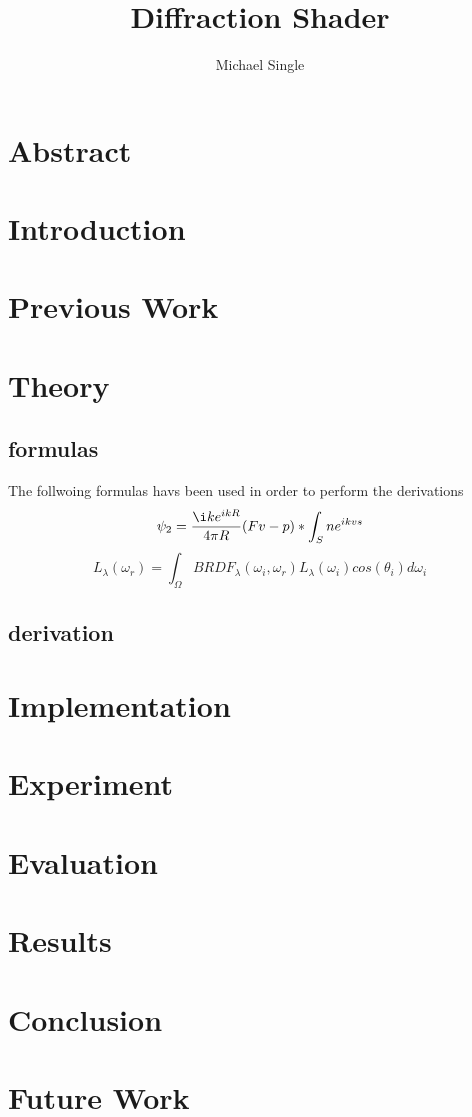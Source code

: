 \documentclass[12pt]{article}
\begin{document}
\title{Diffraction Shader}
\author{Michael Single}
\maketitle

\section{Abstract}
\section{Introduction}
\section{Previous Work}
\section{Theory}
	\subsection{formulas}
	The follwoing formulas havs been used in order to perform the derivations
		\begin{equation} 
			\psi_{2} = \frac{\i k e^{ikR}}{4 \pi R}(Fv - p) * \int_S{ne^{ikvs}}
		\end{equation}
		\begin{equation} 
			L_{\lambda}(\omega_{r}) = \int_{\Omega}{BRDF_{\lambda}(\omega_i, \omega_r) L_{\lambda}(\omega_i)cos(\theta_i) d\omega_i}
		\end{equation}
	\subsection{derivation}

\section{Implementation}
\section{Experiment}
\section{Evaluation}
\section{Results}
\section{Conclusion}
\section{Future Work}
\end{document}
